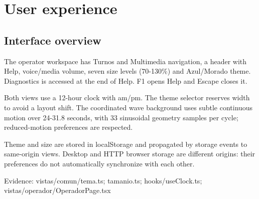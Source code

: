 \section{User experience}
\subsection{Interface overview}

The operator workspace has Turnos and Multimedia navigation, a header with Help, voice/media volume, seven size levels (70-130\%) and Azul/Morado theme. Diagnostics is accessed at the end of Help. F1 opens Help and Escape closes it.

Both views use a 12-hour clock with am/pm. The theme selector reserves width to avoid a layout shift. The coordinated wave background uses subtle continuous motion over 24-31.8 seconds, with 33 sinusoidal geometry samples per cycle; reduced-motion preferences are respected.

Theme and size are stored in localStorage and propagated by storage events to same-origin views. Desktop and HTTP browser storage are different origins: their preferences do not automatically synchronize with each other.

Evidence: vistas/comun/tema.ts; tamanio.ts; hooks/useClock.ts; vistas/operador/OperadorPage.tsx
